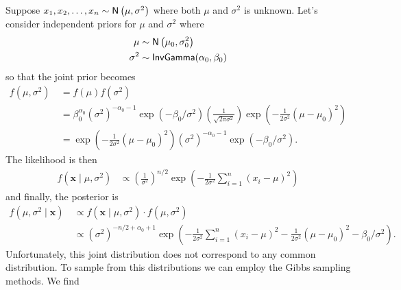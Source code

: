 \begin{exam} \label{exam: bay_norm_4}
    Suppose $x_1 , x_2 , \ldots , x_n \sim {\sf N} \left( \mu , \sigma^2 \right)$ where both $\mu$ and $\sigma^{2}$ is unknown. Let's consider independent priors for $\mu$ and $\sigma^2$ where
    \begin{align*}
        \mu      & \sim {\sf N} \left( \mu_0 , \sigma_0^2 \right) \\
        \sigma^2 & \sim {\sf InvGamma} (\alpha_0 , \beta_0)
    \end{align*}
    so that the joint prior becomes
    \begin{align*}
        f(\mu,\sigma^2) \
         & = f(\mu) f(\sigma^2)                                                                                                                                                                                                        \\
         & = \beta_0^{\alpha_0} \left( \sigma^2 \right)^{-\alpha_0 - 1} \exp \left( - \beta_0 / \sigma^2 \right) \left( \frac{1}{\sqrt{2 \pi \sigma^2}} \right) \exp \left( - \frac{1}{2\sigma^2} \left( \mu - \mu_0 \right)^2 \right) \\
         & = \exp \left( - \frac{1}{2\sigma^2} \left( \mu - \mu_0 \right)^2 \right) \left( \sigma^2 \right)^{-\alpha_0 - 1}  \exp \left( - \beta_0 / \sigma^2 \right).
    \end{align*}
    The likelihood is then
    \begin{align*}
        f(\bm{x} \mid \mu,\sigma^2) & \propto \left( \frac{1}{\sigma^2} \right)^{n/2} \exp \left( - \frac{1}{2\sigma^2} \sum_{i=1}^{n} (x_i - \mu)^2 \right)
    \end{align*}
    and finally, the posterior is
    \begin{align*}
        f(\mu,\sigma^2 \mid \bm{x}) \
         & \propto f(\bm{x} \mid \mu,\sigma^2) \cdot f(\mu,\sigma^2)                                                                                                                                             \\
         & \propto \left( \sigma^2 \right)^{-n/2 + \alpha_0 + 1} \exp \left( - \frac{1}{2\sigma^2} \sum_{i=1}^{n} (x_i - \mu)^2 - \frac{1}{2\sigma^2} \left( \mu - \mu_0 \right)^2 - \beta_0 / \sigma^2 \right).
    \end{align*}
    Unfortunately, this joint distribution does not correspond to any common distribution. To sample from this distributions we can employ the Gibbs sampling methods. We find

\end{exam}

